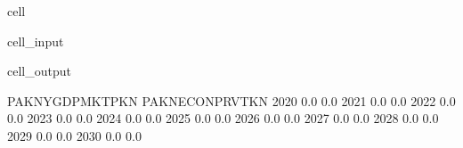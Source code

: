 \documentclass[letterpaper,10pt,english]{jupyterBook}
\begin{document}
\begin{sphinxuseclass}{cell}\begin{sphinxVerbatimInput}

\begin{sphinxuseclass}{cell_input}
\begin{sphinxVerbatim}[commandchars=\\\{\}]
\PYG{p}{[}\PYG{p}{]}
\end{sphinxVerbatim}

\end{sphinxuseclass}\end{sphinxVerbatimInput}
\begin{sphinxVerbatimOutput}

\begin{sphinxuseclass}{cell_output}
\begin{sphinxVerbatim}[commandchars=\\\{\}]
      PAKNYGDPMKTPKN  PAKNECONPRVTKN
2020             0.0             0.0
2021             0.0             0.0
2022             0.0             0.0
2023             0.0             0.0
2024             0.0             0.0
2025             0.0             0.0
2026             0.0             0.0
2027             0.0             0.0
2028             0.0             0.0
2029             0.0             0.0
2030             0.0             0.0
\end{sphinxVerbatim}

\end{sphinxuseclass}\end{sphinxVerbatimOutput}

\end{sphinxuseclass}
\end{document}
